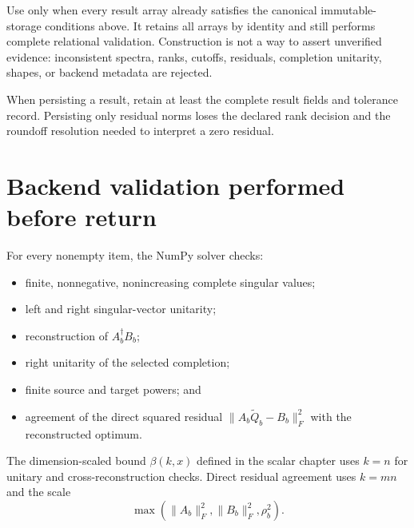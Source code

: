 Use  only when every result array already satisfies the
canonical immutable-storage conditions above. It retains all arrays by identity and
still performs complete relational validation. Construction is not a way to assert
unverified evidence: inconsistent spectra, ranks, cutoffs, residuals, completion
unitarity, shapes, or backend metadata are rejected.

When persisting a result, retain at least the complete result fields and tolerance
record. Persisting only residual norms loses the declared rank decision and the
roundoff resolution needed to interpret a zero residual.

\section{Backend validation performed before return}
For every nonempty item, the NumPy solver checks:
\begin{itemize}
  \item finite, nonnegative, nonincreasing complete singular values;
  \item left and right singular-vector unitarity;
  \item reconstruction of $A_b^\dagger B_b$;
  \item right unitarity of the selected completion;
  \item finite source and target powers; and
  \item agreement of the direct squared residual
        $\lVert A_b\widetilde Q_b-B_b\rVert_F^2$ with the reconstructed optimum.
\end{itemize}
The dimension-scaled bound $\beta(k,x)$ defined in the scalar chapter uses $k=n$ for
unitary and cross-reconstruction checks. Direct residual agreement uses $k=mn$ and the
scale
\[
  \max\!\left(\lVert A_b\rVert_F^2,
  \lVert B_b\rVert_F^2,\rho_b^2\right).
\]

